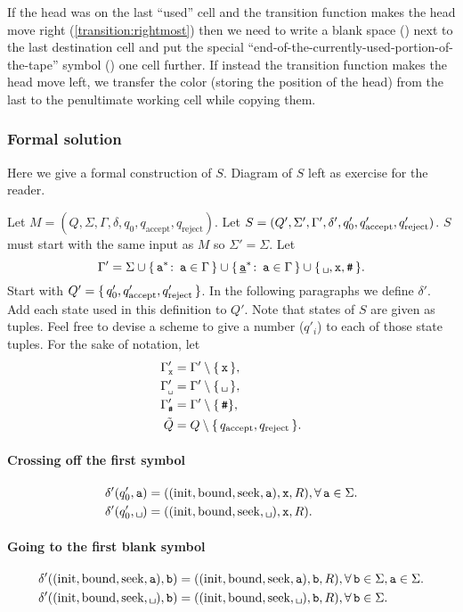 If the head was on the last ``used'' cell and the transition function makes
the head move right (\ref{transition:rightmost}) then we need to write a blank space (\°{}) next to the
last destination
cell and put the special
``end-of-the-currently-used-portion-of-the-tape'' symbol (\e)
one cell further. If instead the transition function makes the head move left,
we transfer the color (storing the position of the head) from the last
to the penultimate working cell while copying them.

\subsubsection{Formal solution}
Here we give a formal construction of $S$.
Diagram of $S$ left as exercise for the reader.

Let $M=(Q,\Sigma,\Gamma,\delta,q_0,q_{\text{accept}},q_{\text{reject}})$.
Let $S=(Q',\Sigma',\Gamma',\delta',q'_0,q'_\text{accept},q'_\text{reject})$.
$S$ must start with the same input as $M$ so $\Sigma'=\Sigma$. Let
$$\Gamma' = \Sigma \cup \{\,\A \st \s \in \Gamma\,\} \cup
\{\,\HA \st \s \in \Gamma\,\} \cup \{\,\0{}, \X, \e\,\}.$$
Start with $Q' = \{\,q'_0,q'_\text{accept},q'_\text{reject}\,\}$. In the following paragraphs we define
$\delta'$. Add each state used in this definition to $Q'$.
Note that states of $S$ are given as tuples. Feel free to devise a scheme to
give a number ($q'_i$) to each of those state tuples.
For the sake of notation, let
\begin{align*}
  \gpwx &= \Gamma' \setminus\{\,\X\,\},\\
  \gpwb &= \Gamma' \setminus\{\,\0{}\,\},\\
  \gpwe &= \Gamma' \setminus\{\,\e\},\\
  \qwar &= Q\setminus\{\,\qa,\qr\,\}.
\end{align*}

\paragraph{Crossing off the first symbol}
\begin{align}
  \delta'(\qpz,\s)
  &= ((\text{init},\text{bound}, \text{seek}, \s), \X, R),
  \forall\, \s \in \Sigma.\\
  \delta'(\qpz,\0{})
  &= ((\text{init},\text{bound}, \text{seek}, \0{}), \X, R).
\end{align}

\paragraph{Going to the first blank symbol}
\begin{align}
  \delta'((\text{init},\text{bound}, \text{seek}, \s), \w)
  &= ((\text{init},\text{bound}, \text{seek}, \s), \w, R),
  \forall\,
  \w \in \Sigma,
  \s \in \Sigma.\\
  \delta'((\text{init},\text{bound}, \text{seek}, \0{}), \w)
  &= ((\text{init},\text{bound}, \text{seek}, \0{}), \w, R),
  \forall\, \w \in \Sigma.
\end{align}

